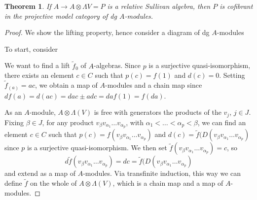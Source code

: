 \documentclass{scrartcl}
\theoremstyle{plain}
\newtheorem{theorem}{Theorem}[section]
\theoremstyle{definition}
\begin{document}
\begin{theorem}\label{thm:sullivan-is-cofibrant}
    If $A\to A\otimes \Lambda V=P$ is a relative Sullivan algebra, then $P$ is cofibrant in the projective model category of dg $A$-modules. 
\end{theorem}
\begin{proof}
    We show the lifting property, hence consider a diagram of dg $A$-modules
    \begin{center}
    \end{center}
    To start, consider 
    \begin{center}
    \end{center}
    We want to find a lift $\tilde f_0$ of $A$-algebras. Since $p$ is a surjective quasi-isomorphism, there exists an element $c\in C$ such that $p(c) = f(1)$ and $d(c) = 0$. Setting $\tilde f_(a) = ac$, we obtain a map of $A$-modules and a chain map since $df(a) = d(ac) = da c \pm a dc = da f(1) = f(da)$. 

    As an $A$-module, $A\otimes \Lambda(V)$ is free with generators the products of the $v_j$, $j\in J$. Fixing $\beta\in J$, for any product $v_\beta v_{\alpha_1}\dots v_{\alpha_p}$, with $\alpha_1< \dots< \alpha_p < \beta$, we can find an element $c\in C$ such that $p(c) = f(v_\beta v_{\alpha_1}\dots v_{\alpha_p})$ and $d(c) = \tilde f(D(v_\beta v_{\alpha_1}\dots v_{\alpha_p})$ since $p$ is a surjective quasi-isomorphism. We then set $\tilde f(v_\beta v_{\alpha_1}\dots v_{\alpha_p}) = c$, so $$d\tilde f(v_\beta v_{\alpha_1}\dots v_{\alpha_p}) = dc = \tilde f(D(v_\beta v_{\alpha_1}\dots v_{\alpha_p})$$ and extend as a map of $A$-modules. Via transfinite induction, this way we can define $\tilde f$ on the whole of $A\otimes \Lambda(V)$, which is a chain map and a map of $A$-modules.
\end{proof}


\newpage


\newpage
\printindex
\end{document}
